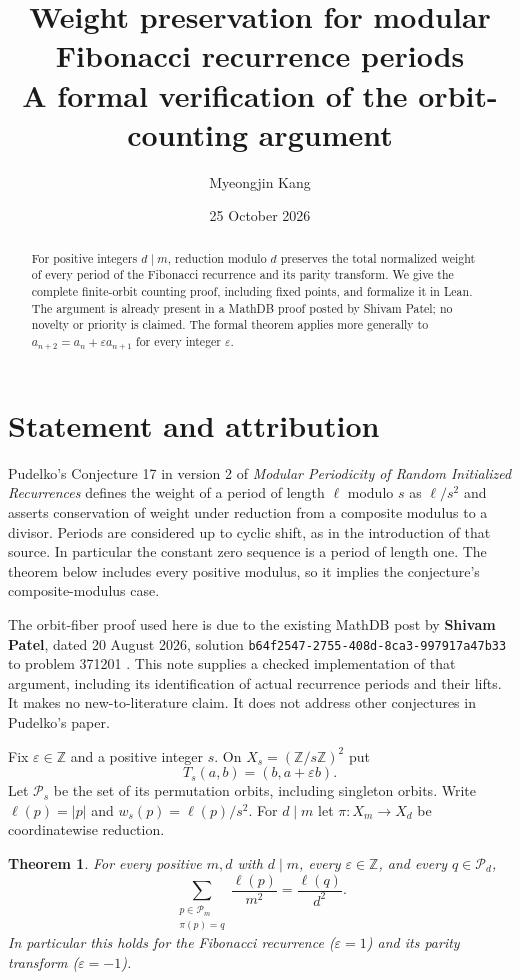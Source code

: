 \documentclass[11pt]{article}
\title{Weight preservation for modular Fibonacci recurrence periods\\
\large A formal verification of the orbit-counting argument}
\author{Myeongjin Kang}
\date{25 October 2026}
\newtheorem{theorem}{Theorem}
\newcommand{\Z}{\mathbb Z}
\begin{document}
\maketitle
\begin{abstract}
For positive integers $d\mid m$, reduction modulo $d$ preserves the total normalized
weight of every period of the Fibonacci recurrence and its parity transform.
We give the complete finite-orbit counting proof, including fixed points, and
formalize it in Lean. The argument is already present in a MathDB proof posted by
Shivam Patel; no novelty or priority is claimed. The formal theorem applies more
generally to $a_{n+2}=a_n+\varepsilon a_{n+1}$ for every integer $\varepsilon$.
\end{abstract}

\section{Statement and attribution}
Pudelko's Conjecture 17 in version 2 of \emph{Modular Periodicity of Random
Initialized Recurrences} \cite{pudelko} defines the weight of a period of length
$\ell$ modulo $s$ as $\ell/s^2$ and asserts conservation of weight under reduction
from a composite modulus to a divisor. Periods are considered up to cyclic shift,
as in the introduction of that source. In particular the constant zero sequence
is a period of length one. The theorem below includes every positive modulus,
so it implies the conjecture's composite-modulus case.

The orbit-fiber proof used here is due to the existing MathDB post by
\textbf{Shivam Patel}, dated 20 August 2026, solution
\nolinkurl{b64f2547-2755-408d-8ca3-997917a47b33} to problem 371201 \cite{patel}.
This note supplies a checked implementation of that argument, including its
identification of actual recurrence periods and their lifts. It makes no
new-to-literature claim. It does not address other conjectures in Pudelko's paper.

Fix $\varepsilon\in\Z$ and a positive integer $s$. On
$X_s=(\Z/s\Z)^2$ put
\[
T_s(a,b)=(b,a+\varepsilon b).
\]
Let $\mathcal P_s$ be the set of its permutation orbits, including singleton
orbits. Write $\ell(p)=|p|$ and $w_s(p)=\ell(p)/s^2$. For $d\mid m$ let
$\pi:X_m\to X_d$ be coordinatewise reduction.

\begin{theorem}\label{thm:main}
For every positive $m,d$ with $d\mid m$, every $\varepsilon\in\Z$, and every
$q\in\mathcal P_d$,
\[
 \sum_{\substack{p\in\mathcal P_m\\\pi(p)=q}}
       \frac{\ell(p)}{m^2}
   =\frac{\ell(q)}{d^2}.
\]
In particular this holds for the Fibonacci recurrence ($\varepsilon=1$) and
its parity transform ($\varepsilon=-1$).
\end{theorem}
\end{document}
